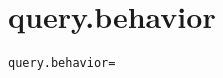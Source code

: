 \section{query.behavior}
\label{configuration:QueryBehavior}
\AvailableInJavaOnly{\TODO}
\begin{lstlisting}[style=Props,caption={Usage example for \textit{query.behavior}}]
query.behavior=
\end{lstlisting}